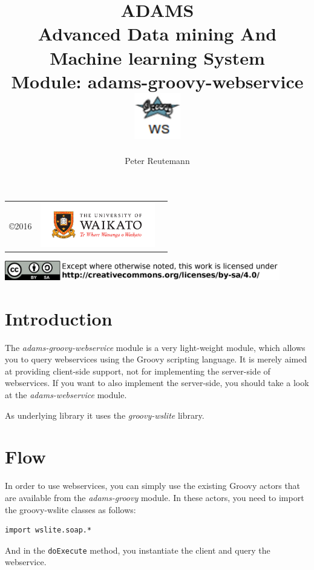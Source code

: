 \documentclass[a4paper]{book}
\title{
  \textbf{ADAMS} \\
  {\Large \textbf{A}dvanced \textbf{D}ata mining \textbf{A}nd \textbf{M}achine
  learning \textbf{S}ystem} \\
  {\Large Module: adams-groovy-webservice} \\
  \vspace{1cm}
  \includegraphics[width=2cm]{images/groovy-webservice-module.png} \\
}
\author{
  Peter Reutemann
}
\begin{document}
\begin{titlepage}
\maketitle

\thispagestyle{empty}
\center
\begin{table}[b]
	\begin{tabular}{c l l}
		\parbox[c][2cm]{2cm}{\copyright 2016} &
		\parbox[c][2cm]{5cm}{\includegraphics[width=5cm]{images/coat_of_arms.pdf}} \\
	\end{tabular}
	\includegraphics[width=12cm]{images/cc.png} \\
\end{table}

\end{titlepage}

\tableofcontents

\chapter{Introduction}
The \textit{adams-groovy-webservice} module is a very light-weight module,
which allows you to query webservices using the Groovy\cite{groovy} scripting
language. It is merely aimed at providing client-side support,
not for implementing the server-side of webservices. If you want to also
implement the server-side, you should take a look at the \textit{adams-webservice}
module.

As underlying library it uses the \textit{groovy-wslite}\cite{groovy-wslite}
library.

\chapter{Flow}

In order to use webservices, you can simply use the existing Groovy actors
that are available from the \textit{adams-groovy} module. In these actors,
you need to import the groovy-wslite classes as follows:
\begin{verbatim}
import wslite.soap.*
\end{verbatim}
And in the \texttt{doExecute} method, you instantiate the client and query the
webservice.
\end{document}

